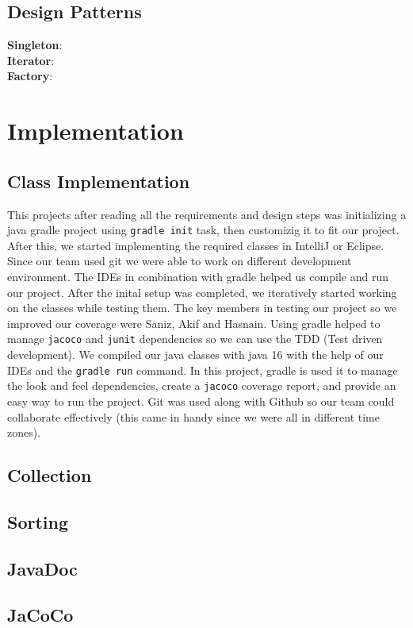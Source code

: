 \documentclass[12pt, dvipsnames, a4paper]{article}
\newcommand{\code}[1]{\texttt{#1}}
\begin{document}
\subsection{Design Patterns}
\textbf{Singleton}: \\
\textbf{Iterator}: \\
\textbf{Factory}:
\clearpage

\section{Implementation}
\subsection{Class Implementation}
This projects after reading all the requirements and design steps was initializing a java
gradle project using \code{gradle init} task, then customizig it to fit our project. After this, we started implementing
the required classes in IntelliJ or Eclipse. Since our team used git we were able to work on different development environment.
The IDEs in combination with gradle helped us compile and run our project. After the inital setup was completed, we iteratively
started working on the classes while testing them. The key members in testing our project so we improved our
coverage were Saniz, Akif and Hasnain. Using gradle helped to manage \code{jacoco} and \code{junit} dependencies so we can use
the TDD (Test driven development). We compiled our java classes with java 16 with the help of our IDEs and the \code{gradle run} command.
In this project, gradle is used it to manage the look and feel dependencies, create a \code{jacoco} coverage report, and provide an easy
way to run the project. Git was used along with Github so our team could collaborate effectively (this came in handy since we were all in different
time zones).

\subsection{Collection}
\subsection{Sorting}
\subsection{JavaDoc}
\subsection{JaCoCo}
\end{document}
